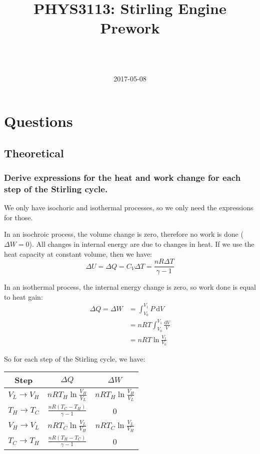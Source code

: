 \documentclass[a4paper]{scrartcl}
\begin{document}
\title{PHYS3113: Stirling Engine Prework}
\author{ \\ \\ }
\date{2017-05-08}
\maketitle

\section{Questions}
\subsection{Theoretical}
\subsubsection{Derive expressions for the heat and work change for each step of the Stirling cycle.}
We only have isochoric and isothermal processes, so we only need the expressions for those.

In an isochroic process, the volume change is zero, therefore no work is done (\(\Delta W = 0\)). All changes in internal energy are due to changes in heat. If we use the heat capacity at constant volume, then we have:
\[\Delta U = \Delta Q = C_V \Delta T = \frac{n R \Delta T}{\gamma - 1}\]

In an isothermal process, the internal energy change is zero, so work done is equal to heat gain:
\begin{align*}
    \Delta Q = \Delta W &= \int_{V_0}^{V_1} P \:\mathrm{d} V \\
    &= n R T \int_{V_0}^{V_1} \frac{\mathrm{d} V}{V} \\
    &= n R T \ln \frac{V_1}{V_0}
\end{align*}

So for each step of the Stirling cycle, we have:
\begin{center}
\begin{tabular}{c | c | c}
    Step & \(\Delta Q\) & \(\Delta W\) \\
    \hline
    \(V_L \to V_H\) & \(n R T_H \ln \frac{V_H}{V_L}\) & \(n R T_H \ln \frac{V_H}{V_L}\) \\
    \(T_H \to T_C\) & \(\frac{n R (T_C - T_H)}{\gamma - 1}\) & 0 \\
    \(V_H \to V_L\) & \(n R T_C \ln \frac{V_L}{V_H}\) & \(n R T_C \ln \frac{V_L}{V_H}\) \\
    \(T_C \to T_H\) & \(\frac{n R (T_H - T_C)}{\gamma - 1}\) & 0
\end{tabular}
\end{center}
\end{document}

